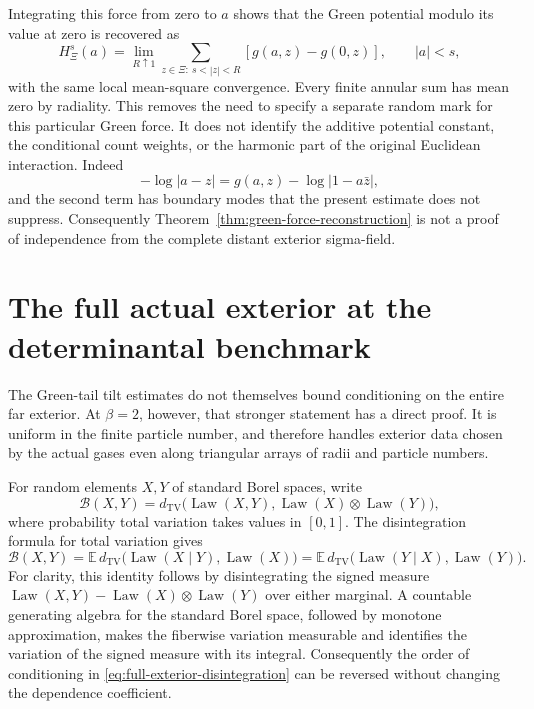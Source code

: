 \documentclass[11pt]{article}
\theoremstyle{remark}\newtheorem{remark}[theorem]{Remark}
\begin{document}
Integrating this force from zero to $a$ shows that the Green potential
modulo its value at zero is recovered as
\[
 H_\Xi^s(a)=\lim_{R\uparrow1}
       \sum_{z\in\Xi:\ s<|z|<R}[g(a,z)-g(0,z)],\qquad |a|<s,
\]
with the same local mean-square convergence. Every finite annular
sum has mean zero by radiality. This removes the need to specify a
separate random mark for this particular Green force. It does not
identify the additive potential constant, the conditional count
weights, or the harmonic part of the original Euclidean interaction.
Indeed
\[
 -\log|a-z|=g(a,z)-\log|1-a\bar z|,
\]
and the second term has boundary modes that the present estimate
does not suppress. Consequently
Theorem~\ref{thm:green-force-reconstruction} is not a proof of independence
from the complete distant exterior sigma-field.


\section{The full actual exterior at the determinantal benchmark}
\label{sec:full-exterior-benchmark}

The Green-tail tilt estimates do not themselves bound conditioning on
the entire far exterior.  At $\beta=2$, however, that stronger statement
has a direct proof.  It is uniform in the finite particle number, and
therefore handles exterior data chosen by the actual gases even along
triangular arrays of radii and particle numbers.

For random elements $X,Y$ of standard Borel spaces, write
\[
 \mathcal B(X,Y)
 =d_{\mathrm{TV}}\bigl(\operatorname{Law}(X,Y),
              \operatorname{Law}(X)\otimes\operatorname{Law}(Y)\bigr),
\]
where probability total variation takes values in $[0,1]$.
The disintegration formula for total variation gives
\begin{equation}\label{eq:full-exterior-disintegration}
 \mathcal B(X,Y)
 =\mathbb E\,d_{\mathrm{TV}}
       \bigl(\operatorname{Law}(X\mid Y),\operatorname{Law}(X)\bigr)
 =\mathbb E\,d_{\mathrm{TV}}
       \bigl(\operatorname{Law}(Y\mid X),\operatorname{Law}(Y)\bigr).
\end{equation}
For clarity, this identity follows by disintegrating the signed measure
$\operatorname{Law}(X,Y)-\operatorname{Law}(X)\otimes\operatorname{Law}(Y)$
over either marginal.  A countable generating algebra for the standard
Borel space, followed by monotone approximation, makes the fiberwise
variation measurable and identifies the variation of the signed measure
with its integral.  Consequently the order of conditioning in
\eqref{eq:full-exterior-disintegration} can be reversed without changing
the dependence coefficient.
\end{document}
